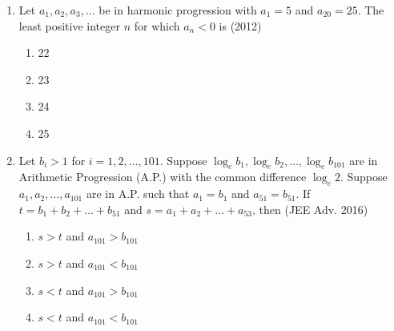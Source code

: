 \documentclass[journal]{IEEEtran}
\theoremstyle{remark}
\begin{document}
\begin{enumerate}
\item Let ${a_1,a_2,a_3,\dots}$ be in harmonic progression with ${a_1}=5$ and ${a_{20}}=25$. The least positive integer $n$ for which ${a_n<0}$ is \hfill(2012)
               \begin{multicols}{4}
                \begin{enumerate}
                    \item 22
                    \item 23
                    \item 24
                    \item 25
                    \end{enumerate}
                    \end{multicols}
\item Let ${b_i}>1$ for $i=1,2,\dots,101$. Suppose ${\log_e}{b_1},{\log_e}{b_2},\dots,{\log_e}{b_{101}}$ are in Arithmetic Progression (A.P.) with the common difference ${\log_e}2$. Suppose ${a_1,a_2,\dots,a_{101}}$ are in A.P. such that ${a_1=b_1}$ and ${a_{51}=b_{51}}$. If $t={b_1+b_2+\dots+b_{51}}$ and $s={a_1+a_2+\dots+a_{53}}$, then \hfill (JEE Adv. 2016)
                    \begin{multicols}{2}
                    \begin{enumerate}
                    
                        \item $s>t$ and ${a_{101}>b_{101}}$
                        \item $s>t$ and ${a_{101}<b_{101}}$
                        \item $s<t$ and ${a_{101}>b_{101}}$
                        \item $s<t$ and ${a_{101}<b_{101}}$
                        \end{enumerate}
                        \end{multicols}
    
\end{enumerate}
\end{document}
